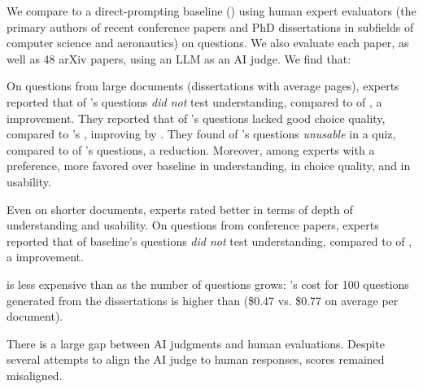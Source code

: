 We compare \name to a direct-prompting baseline (\Baseline) using \totalevaluators human expert evaluators (the primary authors of \numpapers recent conference papers and \numphd PhD dissertations in subfields of computer science and aeronautics) on \numtotalhumanquestion questions. We also evaluate each paper, as well as 48 arXiv papers, using an LLM as an AI judge.
We find that: 
\begin{CompactEnumerate}
    \item On \numphdquestions questions from \numphdevaluators large documents (dissertations with average \avgphdpages pages), experts reported that \baselinephdunderstanding of \Baseline's questions {\em did not} test understanding, compared to \savaalphdunderstanding of \name, a \phdunderstandingreduction improvement. 
    They reported that \baselinephdchoices of \Baseline's questions lacked good choice quality, compared to \name's \savaalphdchoices, improving by \phdchoicesreduction. They found \baselinephdusability of \Baseline's questions {\em unusable} in a quiz, compared to \savaalphdusability of \name's questions, a \phdusabilityreduction reduction. Moreover, among experts with a preference, \understandingpreferration more favored \name over baseline in understanding, \choicespreferration in choice quality, and \usabilitypreferration in usability.


    \item Even on shorter documents, experts rated \name better in terms of depth of understanding and usability. On \numpaperquestions questions from \numpapers conference papers, \numpaperevaluators experts reported that \baselinepaperunderstanding of baseline's questions {\em did not} test understanding, compared to \savaalpaperunderstanding of \name, a \paperunderstandingreduction improvement. 
    

    
    \item \name is less expensive than \Baseline as the number of questions grows: \Baseline's cost for 100 questions generated from the dissertations is \directcostinflation higher than \name (\$0.47 vs. \$0.77 on average per document).

    
    \item There is a large gap between AI judgments and human evaluations. Despite several attempts to align the AI judge to human responses, scores remained misaligned.%

\end{CompactEnumerate}


